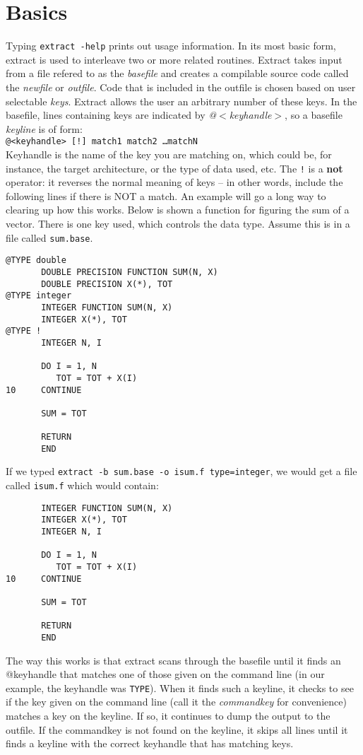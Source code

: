 \section{Basics}
Typing {\tt extract -help} prints out usage information.
In its most basic form, extract is used to interleave two or more related
routines.  Extract takes input from a file refered to as the {\em basefile}
and creates a compilable source code called the {\em newfile} or {\em outfile}.  
Code that is included in the outfile is chosen based on user selectable {\em keys}.
Extract allows the user an arbitrary number of these keys.
In the basefile, lines
containing keys are indicated by {\em @$<$keyhandle$>$}, 
so a basefile {\em keyline} is of form:\\
{\tt @<keyhandle> [!] match1 match2 \ldots matchN}\\
Keyhandle is the name of the key you are matching on, which
could be, for instance, the target architecture, or the 
type of data used, etc.  The {\tt !} is a {\bf not} operator:
it reverses the normal meaning of keys -- in other words, include
the following lines if there is NOT a match.
An example will go a long way to clearing up how this works. Below
is shown a function for figuring the sum of a vector.  There is one
key used, which controls the data type.  Assume this is in a file
called {\tt sum.base}.
\begin{verbatim}
@TYPE double
       DOUBLE PRECISION FUNCTION SUM(N, X)
       DOUBLE PRECISION X(*), TOT
@TYPE integer
       INTEGER FUNCTION SUM(N, X)
       INTEGER X(*), TOT
@TYPE !
       INTEGER N, I

       DO I = 1, N
          TOT = TOT + X(I)
10     CONTINUE

       SUM = TOT

       RETURN
       END
\end{verbatim}
If we typed {\tt extract -b sum.base -o isum.f type=integer}, we would
get a file called {\tt isum.f} which would contain:
\begin{verbatim}
       INTEGER FUNCTION SUM(N, X)
       INTEGER X(*), TOT
       INTEGER N, I

       DO I = 1, N
          TOT = TOT + X(I)
10     CONTINUE

       SUM = TOT

       RETURN
       END
\end{verbatim}
The way this works is that extract scans through the basefile
until it finds an @keyhandle that matches one of those given on the
command line (in our example, the keyhandle was {\tt TYPE}).  When it finds
such a keyline, it checks to see if the key given on the command line (call
it the {\em commandkey} for convenience)
matches a key on the keyline.  If so, it continues to dump the output
to the outfile.  If the commandkey is not found on the keyline,
it skips all lines until it finds a keyline with the correct keyhandle that
has matching keys.

